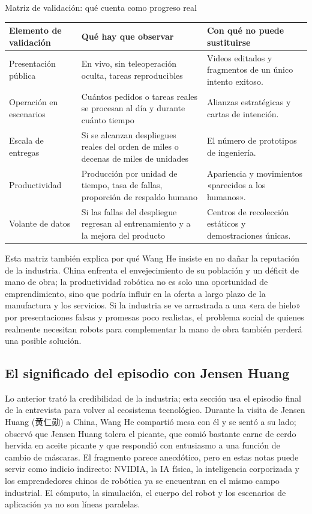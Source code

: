 \begin{knowledgebox}{Matriz de validación: qué cuenta como progreso real}
\begin{tabularx}{\textwidth}{p{}p{}X}
\toprule
Elemento de validación & Qué hay que observar & Con qué no puede sustituirse \\
\midrule
Presentación pública & En vivo, sin teleoperación oculta, tareas reproducibles & Videos editados y fragmentos de un único intento exitoso. \\
Operación en escenarios & Cuántos pedidos o tareas reales se procesan al día y durante cuánto tiempo & Alianzas estratégicas y cartas de intención. \\
Escala de entregas & Si se alcanzan despliegues reales del orden de miles o decenas de miles de unidades & El número de prototipos de ingeniería. \\
Productividad & Producción por unidad de tiempo, tasa de fallas, proporción de respaldo humano & Apariencia y movimientos «parecidos a los humanos». \\
Volante de datos & Si las fallas del despliegue regresan al entrenamiento y a la mejora del producto & Centros de recolección estáticos y demostraciones únicas. \\
\bottomrule
\end{tabularx}
\end{knowledgebox}

Esta matriz también explica por qué Wang He insiste en no dañar la reputación de la industria. China enfrenta el envejecimiento de su población y un déficit de mano de obra; la productividad robótica no es solo una oportunidad de emprendimiento, sino que podría influir en la oferta a largo plazo de la manufactura y los servicios. Si la industria se ve arrastrada a una «era de hielo» por presentaciones falsas y promesas poco realistas, el problema social de quienes realmente necesitan robots para complementar la mano de obra también perderá una posible solución.

\subsection{El significado del episodio con Jensen Huang}

Lo anterior trató la credibilidad de la industria; esta sección usa el episodio final de la entrevista para volver al ecosistema tecnológico. Durante la visita de Jensen Huang (黄仁勋) a China, Wang He compartió mesa con él y se sentó a su lado; observó que Jensen Huang tolera el picante, que comió bastante carne de cerdo hervida en aceite picante y que respondió con entusiasmo a una función de cambio de máscaras. El fragmento parece anecdótico, pero en estas notas puede servir como indicio indirecto: NVIDIA, la IA física, la inteligencia corporizada y los emprendedores chinos de robótica ya se encuentran en el mismo campo industrial. El cómputo, la simulación, el cuerpo del robot y los escenarios de aplicación ya no son líneas paralelas.

